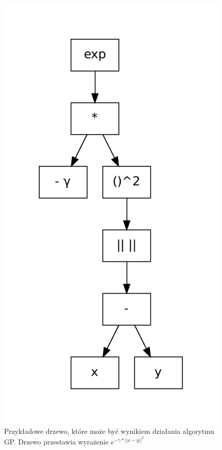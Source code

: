 \begin{figure}[h]
\centering
\includegraphics[scale=0.6]{figures/graphs/2-tree}
\caption{Przykładowe drzewo, które może być wynikiem działania algorytmu GP. Drzewo przestawia wyrażenie $ e^{-\gamma*||x-y||^2} $ \label{fig:2-tree}}
\end{figure}


